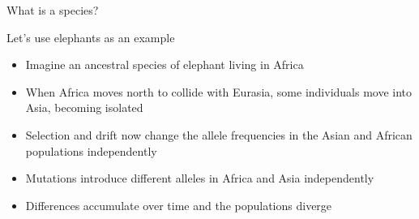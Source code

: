 \begin{frame}
\begin{adjustwidth}{-1.5em}{-1.5em}
    What is a species?

    \vspace{1cm}
\end{adjustwidth}
\end{frame}

\begin{frame}
\begin{adjustwidth}{-1.5em}{-1.5em}
    Let's use elephants as an example
    \begin{itemize}
        \item<2-> Imagine an ancestral species of elephant living in Africa
        \item<3-> When Africa moves north to collide with Eurasia, some
            individuals move into Asia, becoming isolated
        \item<4-> Selection and drift now change the allele frequencies in the
            Asian and African populations independently
        \item<5-> Mutations introduce different alleles in Africa and Asia
            independently
        \item<6-> Differences accumulate over time and the populations diverge

    \end{itemize}
\end{adjustwidth}
\end{frame}




